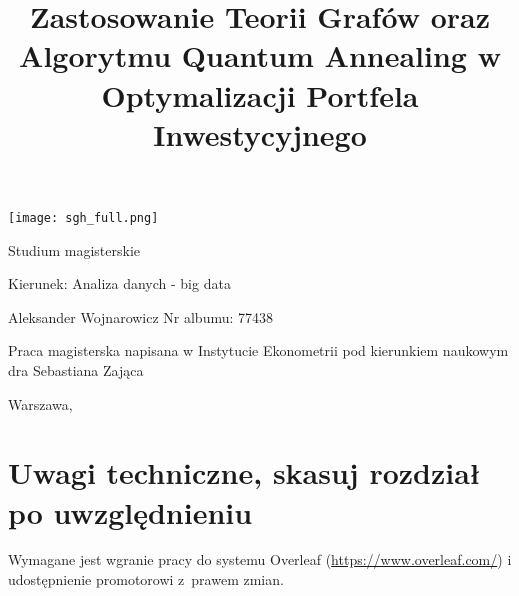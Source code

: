 \documentclass[12pt,a4paper,twoside,openany]{book}
\begin{document}
\begin{center}
\texttt{[image: sgh\_full.png]}

\vspace{1cm}

Studium magisterskie
\end{center}

\vspace{1cm}

\noindent Kierunek: Analiza danych - big data

\vspace{1cm}

{
\leftskip=10cm\noindent
Aleksander Wojnarowicz\newline
Nr albumu: 77438

}

\vspace{2cm}

\title{Zastosowanie Teorii Grafów oraz Algorytmu Quantum Annealing w Optymalizacji Portfela Inwestycyjnego}
\makeatletter

\begin{center}
\LARGE\bf
{\@title}
\end{center}

\vspace{2cm}

{
\leftskip=10cm\noindent
Praca magisterska
napisana w\newline
Instytucie Ekonometrii\newline
pod kierunkiem naukowym\newline
dra Sebastiana Zająca

}

\vfill

\begin{center}
Warszawa, \the\year
\end{center}
\thispagestyle{empty}

\clearpage
\thispagestyle{empty}
\mbox{}
\clearpage

\tableofcontents

\clearpage

\chapter*{Uwagi techniczne, skasuj rozdział po uwzględnieniu}

Wymagane jest wgranie pracy do systemu Overleaf (\url{https://www.overleaf.com/}) i udostępnienie promotorowi z~prawem zmian.
\end{document}
